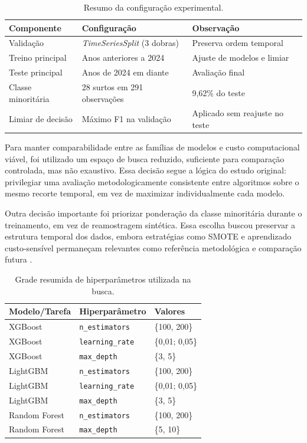 \begin{table}[H]
\centering
\caption{Resumo da configura\c{c}\~ao experimental.}
\label{tab:configuracao}
\tabelafonte
\begin{tabular}{lll}
\toprule
Componente & Configura\c{c}\~ao & Observa\c{c}\~ao \\
\midrule
Valida\c{c}\~ao & \textit{TimeSeriesSplit} (3 dobras) & Preserva ordem temporal \\
Treino principal & Anos anteriores a 2024 & Ajuste de modelos e limiar \\
Teste principal & Anos de 2024 em diante & Avalia\c{c}\~ao final \\
Classe minorit\'aria & 28 surtos em 291 observa\c{c}\~oes & 9,62\% do teste \\
Limiar de decis\~ao & M\'aximo F1 na valida\c{c}\~ao & Aplicado sem reajuste no teste \\
\bottomrule
\end{tabular}
\end{table}

Para manter comparabilidade entre as fam\'ilias de modelos e custo computacional vi\'avel, foi utilizado um espa\c{c}o de busca reduzido, suficiente para compara\c{c}\~ao controlada, mas n\~ao exaustivo. Essa decis\~ao segue a l\'ogica do estudo original: privilegiar uma avalia\c{c}\~ao metodologicamente consistente entre algoritmos sobre o mesmo recorte temporal, em vez de maximizar individualmente cada modelo.

Outra decis\~ao importante foi priorizar pondera\c{c}\~ao da classe minorit\'aria durante o treinamento, em vez de reamostragem sint\'etica. Essa escolha buscou preservar a estrutura temporal dos dados, embora estrat\'egias como SMOTE e aprendizado custo-sens\'ivel permane\c{c}am relevantes como refer\^encia metodol\'ogica e compara\c{c}\~ao futura \cite{chawla2002smote,elkan2001foundations}.

\begin{table}[H]
\centering
\caption{Grade resumida de hiperpar\^ametros utilizada na busca.}
\label{tab:grade}
\tabelafonte
\begin{tabular}{lll}
\toprule
Modelo/Tarefa & Hiperpar\^ametro & Valores \\
\midrule
XGBoost & \texttt{n\_estimators} & \{100, 200\} \\
XGBoost & \texttt{learning\_rate} & \{0,01; 0,05\} \\
XGBoost & \texttt{max\_depth} & \{3, 5\} \\
LightGBM & \texttt{n\_estimators} & \{100, 200\} \\
LightGBM & \texttt{learning\_rate} & \{0,01; 0,05\} \\
LightGBM & \texttt{max\_depth} & \{3, 5\} \\
Random Forest & \texttt{n\_estimators} & \{100, 200\} \\
Random Forest & \texttt{max\_depth} & \{5, 10\} \\
\bottomrule
\end{tabular}
\end{table}

